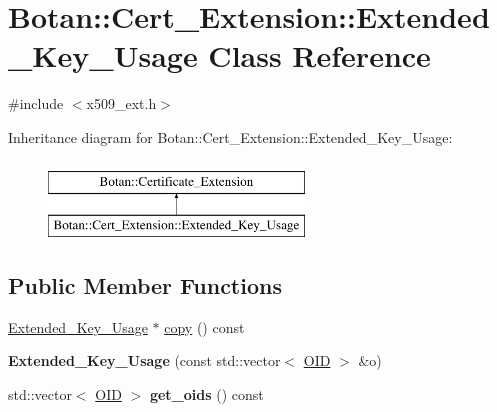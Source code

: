\hypertarget{classBotan_1_1Cert__Extension_1_1Extended__Key__Usage}{\section{Botan\-:\-:Cert\-\_\-\-Extension\-:\-:Extended\-\_\-\-Key\-\_\-\-Usage Class Reference}
\label{classBotan_1_1Cert__Extension_1_1Extended__Key__Usage}
}


{\ttfamily \#include $<$x509\-\_\-ext.\-h$>$}

Inheritance diagram for Botan\-:\-:Cert\-\_\-\-Extension\-:\-:Extended\-\_\-\-Key\-\_\-\-Usage\-:\begin{figure}[H]
\begin{center}
\leavevmode
\includegraphics[height=2.000000cm]{classBotan_1_1Cert__Extension_1_1Extended__Key__Usage}
\end{center}
\end{figure}
\subsection*{Public Member Functions}
\begin{DoxyCompactItemize}
\item 
\hyperlink{classBotan_1_1Cert__Extension_1_1Extended__Key__Usage}{Extended\-\_\-\-Key\-\_\-\-Usage} $\ast$ \hyperlink{classBotan_1_1Cert__Extension_1_1Extended__Key__Usage_a5f488525f04c46428aed8ab5ecb82e50}{copy} () const 
\item 
\hypertarget{classBotan_1_1Cert__Extension_1_1Extended__Key__Usage_af1f2900d913f182f0f7b17e7ef5c5d5e}{{\bfseries Extended\-\_\-\-Key\-\_\-\-Usage} (const std\-::vector$<$ \hyperlink{classBotan_1_1OID}{O\-I\-D} $>$ \&o)}\label{classBotan_1_1Cert__Extension_1_1Extended__Key__Usage_af1f2900d913f182f0f7b17e7ef5c5d5e}

\item 
\hypertarget{classBotan_1_1Cert__Extension_1_1Extended__Key__Usage_ac93481c2768bb9ad66c20c31f10f0fde}{std\-::vector$<$ \hyperlink{classBotan_1_1OID}{O\-I\-D} $>$ {\bfseries get\-\_\-oids} () const }\label{classBotan_1_1Cert__Extension_1_1Extended__Key__Usage_ac93481c2768bb9ad66c20c31f10f0fde}

\end{DoxyCompactItemize}


